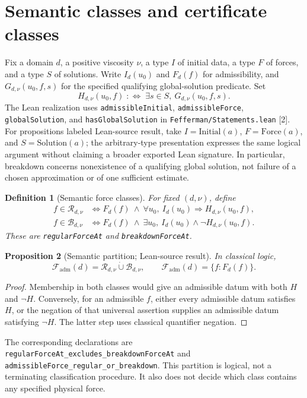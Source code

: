 \documentclass[11pt,a4paper]{article}
\newtheorem{proposition}{Proposition}[section]
\newtheorem{definition}[proposition]{Definition}
\theoremstyle{remark}\newtheorem{remark}[proposition]{Remark}
\newcommand{\Reg}{\mathcal R}
\newcommand{\Bad}{\mathcal B}
\newcommand{\Adm}{\mathcal F_{\mathrm{adm}}}
\newcommand{\code}[1]{\nolinkurl{#1}}
\newcommand{\verified}{\textsf{Lean-source result}}
\begin{document}
\clearpage
\section{Semantic classes and certificate classes}
Fix a domain $d$, a positive viscosity $\nu$, a type $I$ of initial data, a type $F$ of forces, and a type $S$ of solutions. Write $I_d(u_0)$ and $F_d(f)$ for admissibility, and $G_{d,\nu}(u_0,f,s)$ for the specified qualifying global-solution predicate. Set
\[
 H_{d,\nu}(u_0,f)\;:\!\Longleftrightarrow\;
 \exists s\in S,\ G_{d,\nu}(u_0,f,s).
\]
The Lean realization uses \code{admissibleInitial}, \code{admissibleForce}, \code{globalSolution}, and \code{hasGlobalSolution} in \code{Fefferman/Statements.lean} [2]. For propositions labeled \verified, take $I=\mathrm{Initial}(a)$, $F=\mathrm{Force}(a)$, and $S=\mathrm{Solution}(a)$; the arbitrary-type presentation expresses the same logical argument without claiming a broader exported Lean signature. In particular, breakdown concerns nonexistence of a qualifying global solution, not failure of a chosen approximation or of one sufficient estimate.

\begin{definition}[Semantic force classes]
For fixed $(d,\nu)$, define
\begin{align}
 f\in\Reg_{d,\nu}
 &\Longleftrightarrow F_d(f)\ \land\
       \forall u_0,\ I_d(u_0)\Rightarrow H_{d,\nu}(u_0,f),\label{eq:reg}\\
 f\in\Bad_{d,\nu}
 &\Longleftrightarrow F_d(f)\ \land\
       \exists u_0,\ I_d(u_0)\land\neg H_{d,\nu}(u_0,f).\label{eq:bad}
\end{align}
These are \code{regularForceAt} and \code{breakdownForceAt}.
\end{definition}

\begin{proposition}[Semantic partition; \verified]\label{prop:partition}
In classical logic,
\[
 \Adm(d)=\Reg_{d,\nu}\mathbin{\dot\cup}\Bad_{d,\nu},
 \qquad \Adm(d)=\{f:F_d(f)\}.
\]
\end{proposition}
\begin{proof}
Membership in both classes would give an admissible datum with both $H$ and $\neg H$. Conversely, for an admissible $f$, either every admissible datum satisfies $H$, or the negation of that universal assertion supplies an admissible datum satisfying $\neg H$. The latter step uses classical quantifier negation.
\end{proof}
The corresponding declarations are \code{regularForceAt_excludes_breakdownForceAt} and \code{admissibleForce_regular_or_breakdown}. This partition is logical, not a terminating classification procedure. It also does not decide which class contains any specified physical force.
\end{document}
